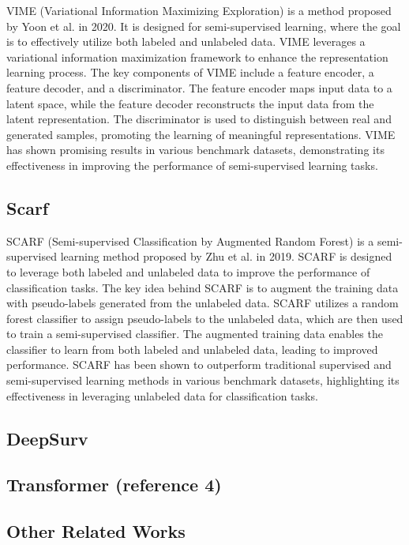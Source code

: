 \documentclass[conference]{ieeeconf}
\begin{document}
VIME (Variational Information Maximizing Exploration) \cite{bahri2022scarf}
is a method proposed by 
Yoon et al. in 2020. It is designed for semi-supervised learning, where the goal
is to effectively utilize both labeled and unlabeled data. VIME leverages a
variational information maximization framework to enhance the representation 
learning process. The key components of VIME include a feature encoder, a 
feature decoder, and a discriminator. The feature encoder maps input data to 
a latent space, while the feature decoder reconstructs the input data from the 
latent representation. The discriminator is used to distinguish between real
and generated samples, promoting the learning of meaningful representations.
VIME has shown promising results in various benchmark datasets, demonstrating
its effectiveness in improving the performance of semi-supervised learning tasks.

\subsection{Scarf}

SCARF (Semi-supervised Classification by Augmented Random Forest) is a semi-supervised learning method proposed by
Zhu et al. in 2019. SCARF is designed to leverage both labeled and unlabeled data
to improve the performance of classification tasks. The key idea behind SCARF is
to augment the training data with pseudo-labels generated from the unlabeled data.
SCARF utilizes a random forest classifier to assign pseudo-labels to the unlabeled
data, which are then used to train a semi-supervised classifier. The augmented
training data enables the classifier to learn from both labeled and unlabeled data,
leading to improved performance. SCARF has been shown to outperform traditional
supervised and semi-supervised learning methods in various benchmark datasets,
highlighting its effectiveness in leveraging unlabeled data for classification tasks.

\subsection{DeepSurv}

\subsection{Transformer (reference 4)}


\subsection{Other Related Works}
\end{document}
